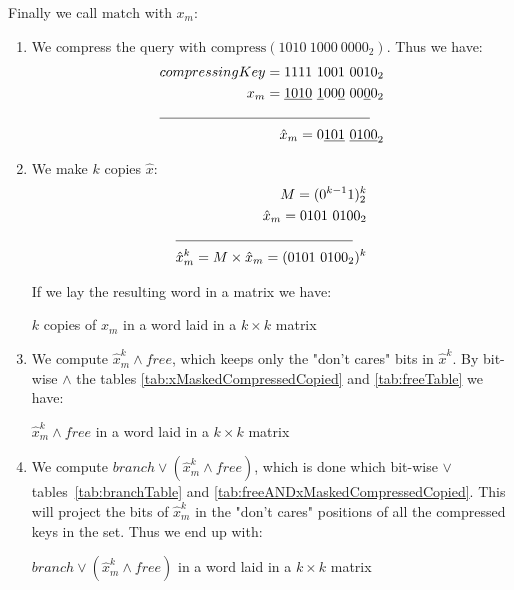 \begin{enumerate}
    Finally we call $\text{match}$ with $x_m$:
    \begin{enumerate}
        \item
        We compress the query with $\text{compress}(1010\ 1000\ 0000_2)$. Thus we have:
        \begin{align*}
            compressingKey = 1111\ 1001\ 0010_2\\
            x_m = \underline{1010}\ \underline{1}00\underline{0}\ 00\underline{0}0_2\\
            \cline{1-2}
            \hat x_m = 0\underline{101}\ \underline{0100}_2
        \end{align*}
        \item
        We make $k$ copies $\hat x$:
        \begin{align*}
            M = (0^{k-1}1)^k_2\\
            \hat x_m = 0101\ 0100_2\\
            \cline{1-2}
            \hat x^k_m = M \times \hat x_m = (0101\ 0100_2)^k\\
        \end{align*}
        
        If we lay the resulting word in a matrix we have:
        \begin{table}[H]
        \centering
        
        \caption[Example of $k$ copies of $\hat x_m$ in a word laid in a $k \times k$ matrix]{$k$ copies of $\hat x_m$ in a word laid in a $k \times k$ matrix}
        \label{tab:xMaskedCompressedCopied}
        \end{table}
        
        \item
        
        We compute $\hat x^k_m \wedge free$, which keeps only the "don't cares" bits in $\hat x^k$. By bit-wise $\wedge$ the tables \ref{tab:xMaskedCompressedCopied} and \ref{tab:freeTable} we have:
        \begin{table}[H]
        \centering
        
        \caption[Example of $\hat x^k_m \wedge free$ in a word laid in a $k \times k$ matrix]{$\hat x^k_m \wedge free$ in a word laid in a $k \times k$ matrix}
        \label{tab:freeANDxMaskedCompressedCopied}
        \end{table}
        
        \item
        We compute $branch \vee (\hat x^k_m \wedge free)$, which is done which bit-wise $\vee$ tables~\ref{tab:branchTable} and \ref{tab:freeANDxMaskedCompressedCopied}. This will project the bits of $\hat x^k_m$ in the "don't cares" positions of all the compressed keys in the set. Thus we end up with:
        \begin{table}[H]
        \centering
        
        \caption[Example of $branch \vee (\hat x^k_m \wedge free)$ in a word laid in a $k \times k$ matrix]{$branch \vee (\hat x^k_m \wedge free)$ in a word laid in a $k \times k$ matrix}
        \label{tab:branchORfreeANDxMCopied}
        \end{table}
        

\end{enumerate}
\end{enumerate}
